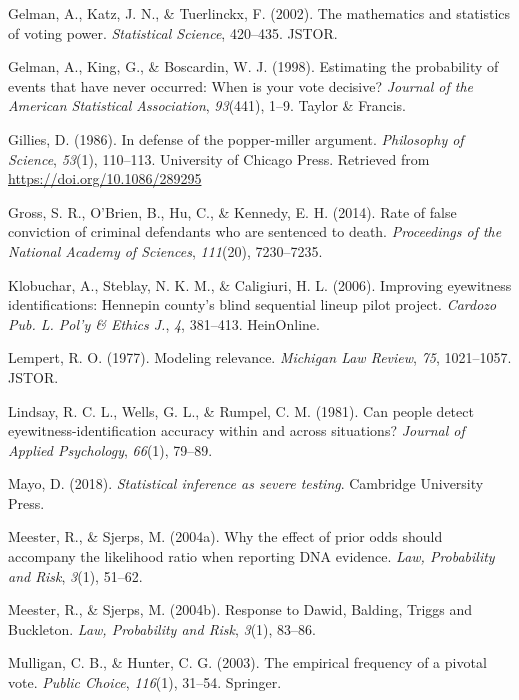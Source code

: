 \documentclass[10pt,dvipsnames,enabledeprecatedfontcommands]{scrartcl}
\begin{document}
\hypertarget{ref-gelman2002mathematics}{}
Gelman, A., Katz, J. N., \& Tuerlinckx, F. (2002). The mathematics and
statistics of voting power. \emph{Statistical Science}, 420--435. JSTOR.

\hypertarget{ref-gelman1998estimating}{}
Gelman, A., King, G., \& Boscardin, W. J. (1998). Estimating the
probability of events that have never occurred: When is your vote
decisive? \emph{Journal of the American Statistical Association},
\emph{93}(441), 1--9. Taylor \& Francis.

\hypertarget{ref-Gillies1986defense}{}
Gillies, D. (1986). In defense of the popper-miller argument.
\emph{Philosophy of Science}, \emph{53}(1), 110--113. University of
Chicago Press. Retrieved from \url{https://doi.org/10.1086/289295}

\hypertarget{ref-gross2014RateFalseConviction}{}
Gross, S. R., O'Brien, B., Hu, C., \& Kennedy, E. H. (2014). Rate of
false conviction of criminal defendants who are sentenced to death.
\emph{Proceedings of the National Academy of Sciences}, \emph{111}(20),
7230--7235.

\hypertarget{ref-klobuchar2006improving}{}
Klobuchar, A., Steblay, N. K. M., \& Caligiuri, H. L. (2006). Improving
eyewitness identifications: Hennepin county's blind sequential lineup
pilot project. \emph{Cardozo Pub. L. Pol'y \& Ethics J.}, \emph{4},
381--413. HeinOnline.

\hypertarget{ref-lempert1977modeling}{}
Lempert, R. O. (1977). Modeling relevance. \emph{Michigan Law Review},
\emph{75}, 1021--1057. JSTOR.

\hypertarget{ref-Lindsay1981CanPeopleDetect}{}
Lindsay, R. C. L., Wells, G. L., \& Rumpel, C. M. (1981). Can people
detect eyewitness-identification accuracy within and across situations?
\emph{Journal of Applied Psychology}, \emph{66}(1), 79--89.

\hypertarget{ref-mayo2018}{}
Mayo, D. (2018). \emph{Statistical inference as severe testing}.
Cambridge University Press.

\hypertarget{ref-meester2004WhyEffectPriora}{}
Meester, R., \& Sjerps, M. (2004a). Why the effect of prior odds should
accompany the likelihood ratio when reporting DNA evidence. \emph{Law,
Probability and Risk}, \emph{3}(1), 51--62.

\hypertarget{ref-meester2004ResponseDawidBalding}{}
Meester, R., \& Sjerps, M. (2004b). Response to Dawid, Balding, Triggs
and Buckleton. \emph{Law, Probability and Risk}, \emph{3}(1), 83--86.

\hypertarget{ref-mulligan2003empirical}{}
Mulligan, C. B., \& Hunter, C. G. (2003). The empirical frequency of a
pivotal vote. \emph{Public Choice}, \emph{116}(1), 31--54. Springer.
\end{document}
